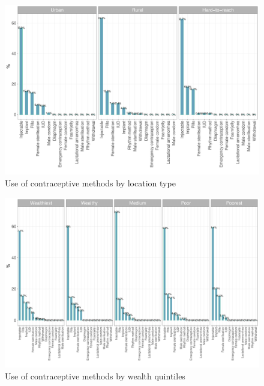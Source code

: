 \documentclass[12pt,a4paper]{article}
\begin{document}
\begin{figure}[H]

{\centering \includegraphics{kayahReport_files/figure-latex/fplan1plot-1} 

}

\caption{Use of contraceptive methods by location type}\label{fig:fplan1plot}
\end{figure}

\begin{figure}[H]

{\centering \includegraphics{kayahReport_files/figure-latex/fplan2plot-1} 

}

\caption{Use of contraceptive methods by wealth quintiles}\label{fig:fplan2plot}
\end{figure}
\end{document}
